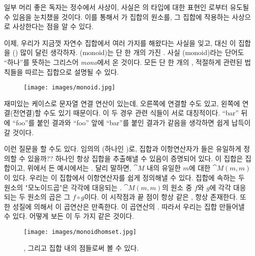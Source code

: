 일부 머리 좋은 독자는 정수에서  사상이, 사실은 의 타입에 대한 표현인 로부터 유도될 수 있음을 눈치챘을 것이다.
이를 통해서 가 \trMonoid 집합의 원소를, 그 집합에 작용하는 사상으로 사상한다는 점을 알 수 있다.

이제, 우리가 지금껏 자연수 집합에서 여러 가지를 해왔다는 사실을 잊고, 대신 이 집합을 () 많이 달린  생각하자.
\trMonoid(monoid)는 단 한 개의  가진 . 사실 \trMonoid(monoid)라는 단어도 ``하나''를 뜻하는 그리스어 \emph{mono}에서 온 것이다.
모든  단 한 개의 , 적절하게  관련된 법칙들을 따르는  집합으로 설명될 수 있다.

\begin{figure}[H]
\centering
\texttt{[image: images/monoid.jpg]}
\end{figure}

\noindent
재미있는 케이스로 문자열 연결 연산이 있는데, 오른쪽에 연결할 수도 있고, 왼쪽에 연결(전연결)할 수도 있기 때문이다.
이 두 경우 \trComposition 관련 식들이 서로 대칭적이다.
``bar'' 뒤에 ``foo''를 붙인 결과와 ``foo'' 앞에 ``bar''를 붙인 결과가 같음을 생각하면 쉽게 납득이 갈 것이다.

이런 질문을 할 수도 있다. 임의의  \trMonoid( 하나인 \trCategory)로, 집합과 이항연산자가 들은  유일하게 정의할 수 있을까??
 하나인  항상 집합을 추출해낼 수 있음이 증명되어 있다. 이 집합은  집합이고, 위에서 든 예시에서는 .
달리 말하면, \trCategory $\cat{M}$ 내의 유일한 \trObject $m$에 대한 \trHomSet $\cat{M}(m, m)$이 있다. 
우리는 이 집합에서 이항연산자를 쉽게 정의해낼 수 있다. 집합에 속하는 두 원소의 "모노이드곱"은 각각에 대응되는  .
$\cat{M}(m, m)$의 원소 중 $f$와 $g$에 각각 대응되는 두 원소의 곱은 그  $f \circ g$이다.
이  시작점과 끝 점이 항상 같은 ,  항상 존재한다. %
또한  성질에 의해서 이 곱연산은  만족한다.  이 곱연산의 . 
따라서 우리는 \trCategory{} 집합  만들어낼 수 있다. 어떻게 보든 이 두 가지  같은 것이다.

\begin{figure}[H]
\centering
\texttt{[image: images/monoidhomset.jpg]}
\caption{, 그리고 집합 내의 점들로써 \trMonoid{} 볼 수 있다.}
\end{figure}

